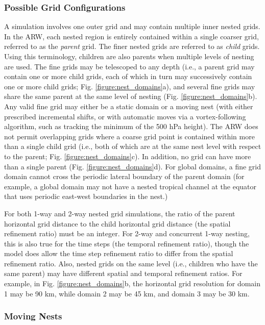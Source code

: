 \subsubsection{Possible Grid Configurations}

A simulation involves one outer grid and may contain multiple
inner nested grids.  In the ARW, each nested region is entirely
contained within 
a single coarser grid, referred to as the {\em parent}
grid.  The finer nested grids are referred to as {\em child} grids.
Using this terminology, children are also parents when multiple levels
of nesting are used.  The fine grids may be telescoped to any depth (i.e., 
a
parent grid may contain one or more child grids, each of which in turn
may successively contain one or more child grids; Fig.
\ref{figure:nest_domains}a), and several fine grids may share the
same parent at the same level of nesting (Fig.
\ref{figure:nest_domains}b).  
Any valid fine grid may either be a static domain or a moving nest
(with either prescribed incremental shifts, or with automatic moves
via a vortex-following algorithm, such as tracking the minimum of the 500 hPa height).  
The ARW does not permit overlapping
grids where a coarse grid point is contained within more than a
single child grid (i.e., both of which are at the same nest level with respect
to the parent; Fig. \ref{figure:nest_domains}c).  In addition, no grid can have
more than a single parent (Fig. \ref{figure:nest_domains}d).  For global domains, a
fine grid domain cannot cross the periodic lateral boundary of the parent domain
(for example, a global domain may not have a nested tropical channel at the 
equator that uses periodic east-west boundaries in the nest.)

For both 1-way and 2-way nested grid simulations, the ratio of the
parent horizontal grid distance to the child horizontal grid distance
(the spatial refinement ratio) must be an integer.  For 2-way and concurrent 1-way
nesting, this is also true for
the time steps (the temporal refinement ratio), though the model does allow
the time step refinement ratio to differ from the spatial refinement
ratio.  Also, nested grids on the same level (i.e., children who have the
same parent) may have different spatial and temporal refinement ratios.  For example,
in Fig. \ref{figure:nest_domains}b, the horizontal grid resolution for 
domain 1 may be 90 km, while
domain 2 may be 45 km, and domain 3 may be 30 km.

\subsubsection{Moving Nests}

